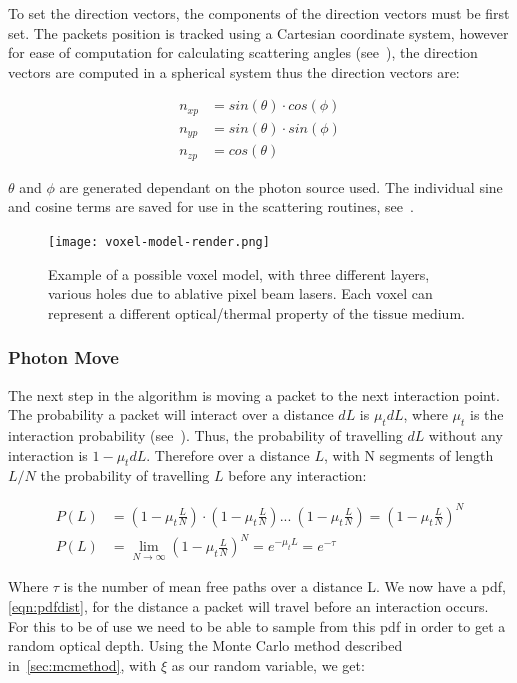 To set the direction vectors, the components of the direction vectors must be first set. The packets position is tracked using a Cartesian coordinate system, however for ease of computation for calculating scattering angles (see~), the direction vectors are computed in a spherical system thus the direction vectors are: 

\begin{align}
n_{xp} &= sin(\theta) \cdot cos(\phi) \\
n_{yp} &= sin(\theta) \cdot sin(\phi) \\
n_{zp} &= cos(\theta)
\end{align}

$\theta$ and $\phi$ are generated dependant on the photon source used. The individual sine and cosine terms are saved for use in the scattering routines, see~.
\FloatBarrier

\begin{figure}[!ht]
\centering
\texttt{[image: voxel-model-render.png]}
\caption{Example of a possible voxel model, with three different layers, various holes due to ablative pixel beam lasers. Each voxel can represent a different optical/thermal property of the tissue medium.}
\label{fig:voxel-model}
\vspace{-20pt}
\end{figure}
\subsubsection*{Photon Move}\label{sec:photmove}

The next step in the algorithm is moving a packet to the next interaction point. The probability a packet will interact over a distance $dL$ is $\mu_tdL$, where $\mu_t$ is the interaction probability (see~). Thus, the probability of travelling $dL$ without any interaction is $1-\mu_tdL$. Therefore over a distance $L$, with N segments of length $L/N$ the probability of travelling $L$ before any interaction:

\begin{align}
P(L) &= (1-\mu_t\frac{L}{N}) \cdot (1-\mu_t\frac{L}{N}) ...\ (1-\mu_t\frac{L}{N}) = (1-\mu_t\frac{L}{N})^N \\
P(L) &= \lim_{N \to \infty}(1-\mu_t\frac{L}{N})^N=e^{-\mu_tL}=e^{-\tau}\label{eqn:pdfdist}
\end{align}

Where $\tau$ is the number of mean free paths over a distance L. We now have a \gls{pdf}, \cref{eqn:pdfdist}, for the distance a packet will travel before an interaction occurs. For this to be of use we need to be able to sample from this \gls{pdf} in order to get a random optical depth. Using the Monte Carlo method described in~\cref{sec:mcmethod}, with $\xi$ as our random variable, we get:

